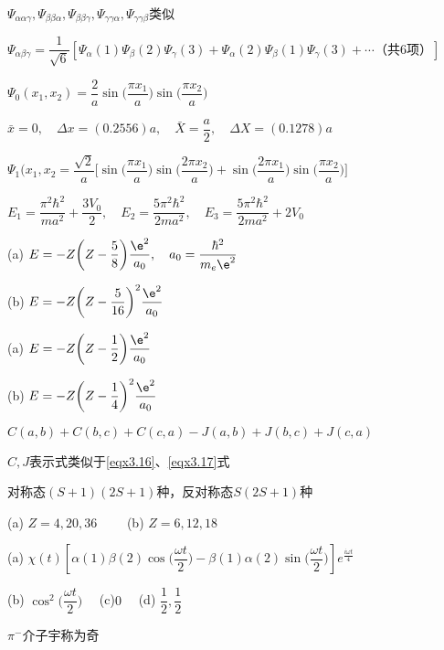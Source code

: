 		$ \Psi_{\alpha\alpha\gamma},\Psi_{\beta\beta\alpha},\Psi_{\beta\beta\gamma},\Psi_{\gamma\gamma\alpha},\Psi_{\gamma\gamma\beta}$类似
		
		$ \Psi_{\alpha\beta\gamma}=\dfrac{1}{\sqrt{6}}[\varPsi_{\alpha}(1)\varPsi_{\beta}(2)\varPsi_{\gamma}(3)+\varPsi_{\alpha}(2)\varPsi_{\beta}(1)\varPsi_{\gamma}(3)+\cdots\text{（共6项）}]$

\answer $ \Psi_{0}(x_{1},x_{2})=\dfrac{2}{a}\sin\bigg(\dfrac{\pi x_{1}}{a}\bigg)\sin\bigg(\dfrac{\pi x_{2}}{a}\bigg) $

		$ \bar{x}=0,\quad \Delta x=(\num{0.2556})a,\quad \bar{X}=\dfrac{a}{2},\quad \Delta X=(\num{0.1278})a $
		
		$ \Psi_{1}(x_{1},x_{2}=\dfrac{\sqrt{2}}{a}\bigg[ \sin\bigg(\dfrac{\pi x_{1}}{a}\bigg)\sin\bigg(\dfrac{2\pi x_{2}}{a}\bigg)+\sin\bigg(\dfrac{2\pi x_{1}}{a}\bigg)\sin\bigg(\dfrac{\pi x_{2}}{a}\bigg) \bigg] $

\answer $ E_{1}=\dfrac{\pi^{2}\hbar^{2}}{ma^{2}}+\dfrac{3V_{0}}{2},\quad E_{2}=\dfrac{5\pi^{2}\hbar^{2}}{2ma^{2}},\quad E_{3}=\dfrac{5\pi^{2}\hbar^{2}}{2ma^{2}}+2V_{0} $

\answer (a) $ E=-Z\bigg(Z-\dfrac{5}{8}\bigg)\dfrac{\e^{2}}{a_{0}},\quad a_{0}=\dfrac{\hbar^{2}}{m_{e}\e^{2}} $
	
		(b) $ E=-Z\bigg(Z-\dfrac{5}{16}\bigg)^{2}\dfrac{\e^{2}}{a_{0}} $

\answer (a) $ E=-Z\bigg(Z-\dfrac{1}{2}\bigg)\dfrac{\e^{2}}{a_{0}} $

		(b) $ E=-Z\bigg(Z-\dfrac{1}{4}\bigg)^{2}\dfrac{\e^{2}}{a_{0}} $


\answer $ C(a,b)+C(b,c)+C(c,a)-J(a,b)+J(b,c)+J(c,a) $

		$C,J$表示式类似于\eqref{eqx3.16}、\eqref{eqx3.17}式

\answer 对称态$(S+1)(2S+1)$种，反对称态$S(2S+1)$种

\answer (a) $ Z=4,20,36 \qquad$	(b) $ Z=6,12,18 $

	

\answer (a) $ \chi(t)\left[\alpha(1)\beta(2)\cos\bigg(\dfrac{\omega t}{2}\bigg)-\beta(1)\alpha(2)\sin\bigg(\dfrac{\omega t}{2}\bigg) \right]e^{\frac{i\omega t}{4}} $

		(b) $ \cos^{2}\bigg(\dfrac{\omega t}{2}\bigg)\quad $ (c)$ 0\quad $ (d) $ \dfrac{1}{2},\dfrac{1}{2} $


\answer $\pi^{-}$介子宇称为奇
